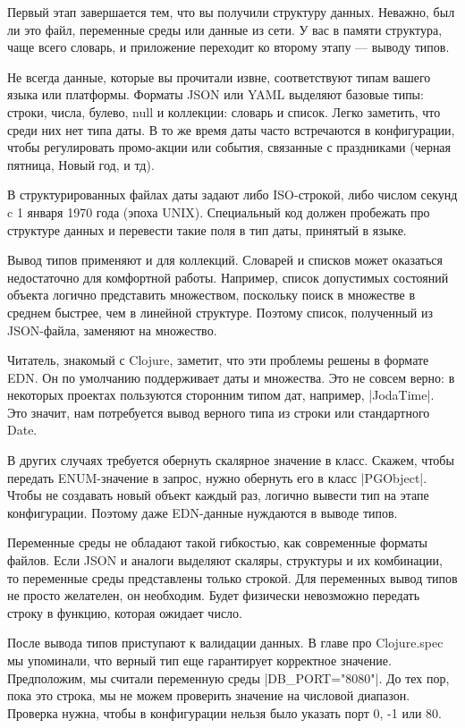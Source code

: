 Первый этап завершается тем, что вы получили структуру данных. Неважно, был ли
это файл, переменные среды или данные из сети. У вас в памяти структура, чаще
всего словарь, и приложение переходит ко второму этапу — выводу типов.

Не всегда данные, которые вы прочитали извне, соответствуют типам вашего языка
или платформы. Форматы JSON или YAML выделяют базовые типы: строки, числа,
булево, null и коллекции: словарь и список. Легко заметить, что среди них нет
типа даты. В то же время даты часто встречаются в конфигурации, чтобы
регулировать промо-акции или события, связанные с праздниками (черная пятница,
Новый год, и тд).

В структурированных файлах даты задают либо ISO-строкой, либо числом секунд c 1
января 1970 года (эпоха UNIX). Специальный код должен пробежать про структуре
данных и перевести такие поля в тип даты, принятый в языке.

Вывод типов применяют и для коллекций. Словарей и списков может оказаться
недостаточно для комфортной работы. Например, список допустимых состояний
объекта логично представить множеством, поскольку поиск в множестве в среднем
быстрее, чем в линейной структуре. Поэтому список, полученный из JSON-файла,
заменяют на множество.

Читатель, знакомый с Clojure, заметит, что эти проблемы решены в формате EDN. Он
по умолчанию поддерживает даты и множества. Это не совсем верно: в некоторых
проектах пользуются сторонним типом дат, например, \spverb|JodaTime|. Это значит, нам
потребуется вывод верного типа из строки или стандартного Date.

В других случаях требуется обернуть скалярное значение в класс. Скажем, чтобы
передать ENUM-значение в запрос, нужно обернуть его в класс \spverb|PGObject|. Чтобы не
создавать новый объект каждый раз, логично вывести тип на этапе
конфигурации. Поэтому даже EDN-данные нуждаются в выводе типов.

Переменные среды не обладают такой гибкостью, как современные форматы
файлов. Если JSON и аналоги выделяют скаляры, структуры и их комбинации, то
переменные среды представлены только строкой. Для переменных вывод типов не
просто желателен, он необходим. Будет физически невозможно передать строку в
функцию, которая ожидает число.

После вывода типов приступают к валидации данных. В главе про Clojure.spec мы
упоминали, что верный тип еще гарантирует корректное значение. Предположим, мы
считали переменную среды \spverb|DB_PORT="8080"|. До тех пор, пока это строка, мы не
можем проверить значение на числовой диапазон. Проверка нужна, чтобы в
конфигурации нельзя было указать порт 0, -1 или 80.


